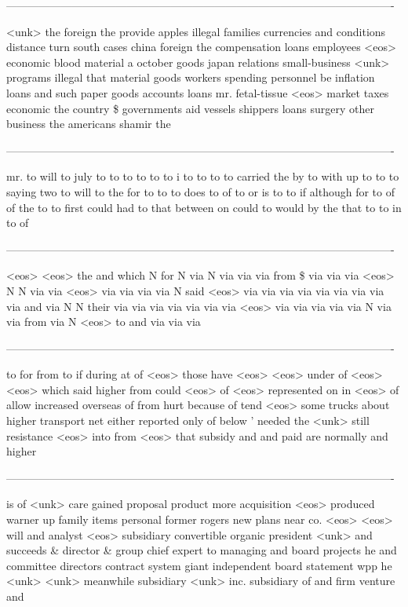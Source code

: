 \begin{enumerate}
----------------------------------------------------------------------------------------------------------

<unk> the foreign the provide apples illegal families currencies and conditions distance turn south cases china foreign the compensation loans employees <eos> economic blood material a october goods japan relations small-business <unk> programs illegal that material goods workers spending personnel be inflation loans and such paper goods accounts loans mr. fetal-tissue <eos> market taxes economic the country \$ governments aid vessels shippers loans surgery other business the americans shamir the

----------------------------------------------------------------------------------------------------------

mr. to will to july to to to to to to i to to to to carried the by to with up to to to saying two to will to the for to to to does to of to or is to to if although for to of of the to to first could had to that between on could to would by the that to to in to of

----------------------------------------------------------------------------------------------------------

<eos> <eos> the and which N for N via N via via via from \$ via via via <eos> N N via via <eos> via via via via N said <eos> via via via via via via via via via and via N N their via via via via via via via <eos> via via via via via N via via from via N <eos> to and via via via

----------------------------------------------------------------------------------------------------------

to for from to if during at of <eos> those have <eos> <eos> under of <eos> <eos> which said higher from could <eos> of <eos> represented on in <eos> of allow increased overseas of from hurt because of tend <eos> some trucks about higher transport net either reported only of below ' needed the <unk> still resistance <eos> into from <eos> that subsidy and and paid are normally and higher

----------------------------------------------------------------------------------------------------------

is of <unk> care gained proposal product more acquisition <eos> produced warner up family items personal former rogers new plans near co. <eos> <eos> will and analyst <eos> subsidiary convertible organic president <unk> and succeeds \& director \& group chief expert to managing and board projects he and committee directors contract system giant independent board statement wpp he <unk> <unk> meanwhile subsidiary <unk> inc. subsidiary of and firm venture and


\end{enumerate}
